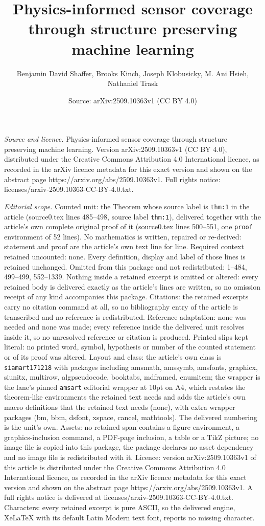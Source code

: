 \documentclass[10pt,a4paper]{amsart}
\title[Physics-informed sensor coverage through structure preservin]{Physics-informed sensor coverage through structure preserving machine learning}
\author{Benjamin David Shaffer, Brooks Kinch, Joseph Klobusicky, M. Ani Hsieh, Nathaniel Trask}
\date{Source: arXiv:2509.10363v1 (CC BY 4.0)}
\begin{document}
\maketitle

\noindent\emph{Source and licence.} Physics-informed sensor coverage through structure preserving machine learning. Version arXiv:2509.10363v1 (CC BY 4.0), distributed under the Creative Commons Attribution 4.0 International licence, as recorded in the arXiv licence metadata for this exact version and shown on the abstract page https://arxiv.org/abs/2509.10363v1. Full rights notice: licenses/arxiv-2509.10363-CC-BY-4.0.txt.\par\smallskip

\noindent\textit{Editorial scope.} Counted unit: the Theorem whose source label is \texttt{thm:1} in the article (source0.tex lines 485--498, source label \texttt{thm:1}), delivered together with the article's own complete original proof of it (source0.tex lines 500--551, one \texttt{proof} environment of 52 lines). No mathematics is written, repaired or re-derived: statement and proof are the article's own text line for line. Required context retained uncounted: none. Every definition, display and label of those lines is retained unchanged. Omitted from this package and not redistributed: 1--484, 499--499, 552--1339. Nothing inside a retained excerpt is omitted or altered: every retained body is delivered exactly as the article's lines are written, so no omission receipt of any kind accompanies this package. Citations: the retained excerpts carry no citation command at all, so no bibliography entry of the article is transcribed and no reference is redistributed. Reference adaptation: none was needed and none was made; every reference inside the delivered unit resolves inside it, so no unresolved reference or citation is produced. Printed slips kept literal: no printed word, symbol, hypothesis or number of the counted statement or of its proof was altered. Layout and class: the article's own class is \texttt{siamart171218} with packages including amsmath, amssymb, amsfonts, graphicx, siunitx, multirow, algpseudocode, booktabs, mdframed, enumitem; the wrapper is the lane's pinned \texttt{amsart} editorial wrapper at 10pt on A4, which restates the theorem-like environments the retained text needs and adds the article's own macro definitions that the retained text needs (none), with extra wrapper packages (bm, bbm, dsfont, xspace, cancel, mathtools). The delivered numbering is the unit's own. Assets: no retained span contains a figure environment, a graphics-inclusion command, a PDF-page inclusion, a table or a TikZ picture; no image file is copied into this package, the package declares no asset dependency and no image file is redistributed with it. Licence: version arXiv:2509.10363v1 of this article is distributed under the Creative Commons Attribution 4.0 International licence, as recorded in the arXiv licence metadata for this exact version and shown on the abstract page https://arxiv.org/abs/2509.10363v1. A full rights notice is delivered at licenses/arxiv-2509.10363-CC-BY-4.0.txt. Characters: every retained excerpt is pure ASCII, so the delivered engine, XeLaTeX with its default Latin Modern text font, reports no missing character.
\end{document}
